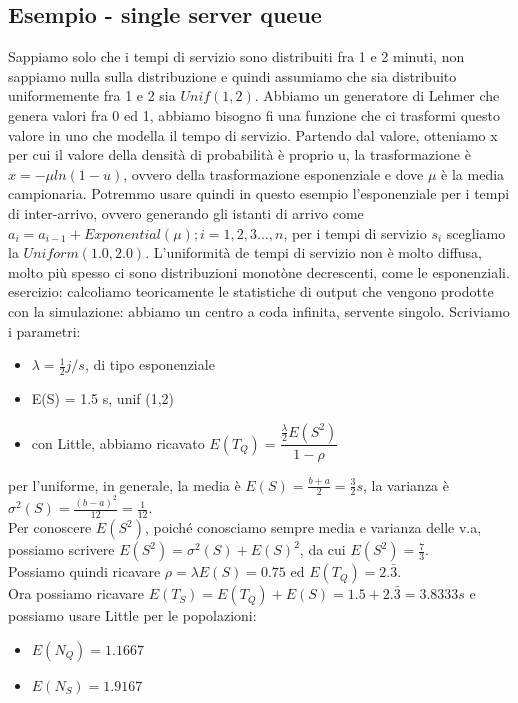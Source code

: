 \documentclass{article}
\begin{document}
\subsection{Esempio - single server queue}
Sappiamo solo che i tempi di servizio sono distribuiti fra 1 e 2 minuti, non sappiamo nulla sulla distribuzione e quindi assumiamo che sia distribuito uniformemente fra 1 e 2 sia $Unif(1,2)$. Abbiamo un generatore di Lehmer che genera valori fra 0 ed 1, abbiamo bisogno fi una funzione che ci trasformi questo valore in uno che modella il tempo di servizio. Partendo dal valore, otteniamo x per cui il valore della densità di probabilità è proprio u, la trasformazione è $x = -\mu ln(1-u)$, ovvero della trasformazione esponenziale e dove $\mu$ è la media campionaria. Potremmo usare quindi in questo esempio l'esponenziale per i tempi di inter-arrivo, ovvero generando gli istanti di arrivo come $a_i = a_{i-1} + Exponential(\mu); i=1,2,3...,n$, per i tempi di servizio $s_i$ scegliamo la $Uniform(1.0, 2.0)$. L'uniformità de tempi di servizio non è molto diffusa, molto più spesso ci sono distribuzioni monotòne decrescenti, come le esponenziali.
\\esercizio: calcoliamo teoricamente le statistiche di output che vengono prodotte con la simulazione: abbiamo un centro a coda infinita, servente singolo. Scriviamo i parametri:
\begin{itemize}
\item $\lambda = \frac{1}{2} j/s$, di tipo esponenziale
\item E(S) = 1.5 s, unif (1,2)
\item con Little, abbiamo ricavato $E(T_Q) = \dfrac{\frac{\lambda}{2}E(S^2)}{1 - \rho}$
\end{itemize}
per l'uniforme, in generale, la media è $E(S) = \frac{b+a}{2} = \frac{3}{2} s$, la varianza è $\sigma^2(S) = \frac{(b-a)^2}{12} = \frac{1}{12}$. \\ Per conoscere $E(S^2)$, poiché conosciamo sempre media e varianza delle v.a, possiamo scrivere $E(S^2) = \sigma^2(S) + E(S)^2$, da cui $E(S^2) = \frac{7}{3}$. \\ Possiamo quindi ricavare $\rho = \lambda E(S) = 0.75$ ed $E(T_Q) = 2.\bar{3}$.\\ Ora possiamo ricavare $E(T_S) = E(T_Q) + E(S) = 1.5 + 2.\bar{3} = 3.8333 s$ e possiamo usare Little per le popolazioni:
\begin{itemize}
\item $E(N_Q) = 1.1667$
\item $E(N_S) = 1.9167$ 
\end{itemize}
\end{document}
